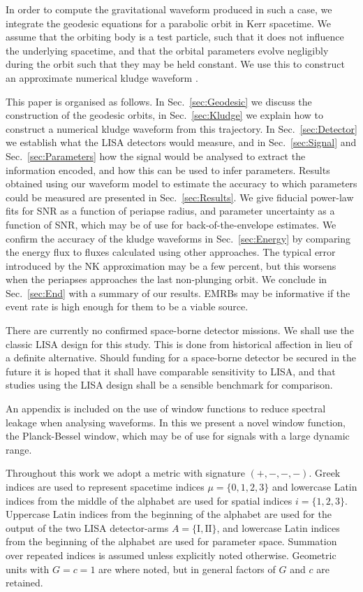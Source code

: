 \documentclass[useAMS,usedcolumn,usegraphicx,usenatbib]{mn2e}
\newcommand{\secref}[1]{Sec.~\ref{sec:#1}}
\begin{document}
In order to compute the gravitational waveform produced in such a case, we integrate the geodesic equations for a parabolic orbit in Kerr spacetime. We assume that the orbiting body is a test particle, such that it does not influence the underlying spacetime, and that the orbital parameters evolve negligibly during the orbit such that they may be held constant. We use this to construct an approximate numerical kludge waveform \citep{Babak2007}.

This paper is organised as follows. In \secref{Geodesic} we discuss the construction of the geodesic orbits, in \secref{Kludge} we explain how to construct a numerical kludge waveform from this trajectory. In \secref{Detector} we establish what the LISA detectors would measure, and in \secref{Signal} and \secref{Parameters} how the signal would be analysed to extract the information encoded, and how this can be used to infer parameters. Results obtained using our waveform model to estimate the accuracy to which parameters could be measured are presented in \secref{Results}. We give fiducial power-law fits for SNR as a function of periapse radius, and parameter uncertainty as a function of SNR, which may be of use for back-of-the-envelope estimates. We confirm the accuracy of the kludge waveforms in \secref{Energy} by comparing the energy flux to fluxes calculated using other approaches. The typical error introduced by the NK approximation may be a few percent, but this worsens when the periapses approaches the last non-plunging orbit. We conclude in \secref{End} with a summary of our results. EMRBs may be informative if the event rate is high enough for them to be a viable source.

There are currently no confirmed space-borne detector missions. We shall use the classic LISA design for this study. This is done from historical affection in lieu of a definite alternative. Should funding for a space-borne detector be secured in the future it is hoped that it shall have comparable sensitivity to LISA, and that studies using the LISA design shall be a sensible benchmark for comparison.

An appendix is included on the use of window functions to reduce spectral leakage when analysing waveforms. In this we present a novel window function, the Planck-Bessel window, which may be of use for signals with a large dynamic range.

Throughout this work we adopt a metric with signature $(+,-,-,-)$. Greek indices are used to represent spacetime indices $\mu = \{0,1,2,3\}$ and lowercase Latin indices from the middle of the alphabet are used for spatial indices $i = \{1,2,3\}$. Uppercase Latin indices from the beginning of the alphabet are used for the output of the two LISA detector-arms $A = \{\mathrm{I}, \mathrm{II}\}$, and lowercase Latin indices from the beginning of the alphabet are used for parameter space. Summation over repeated indices is assumed unless explicitly noted otherwise. Geometric units with $G = c = 1$ are where noted, but in general factors of $G$ and $c$ are retained.
\end{document}

